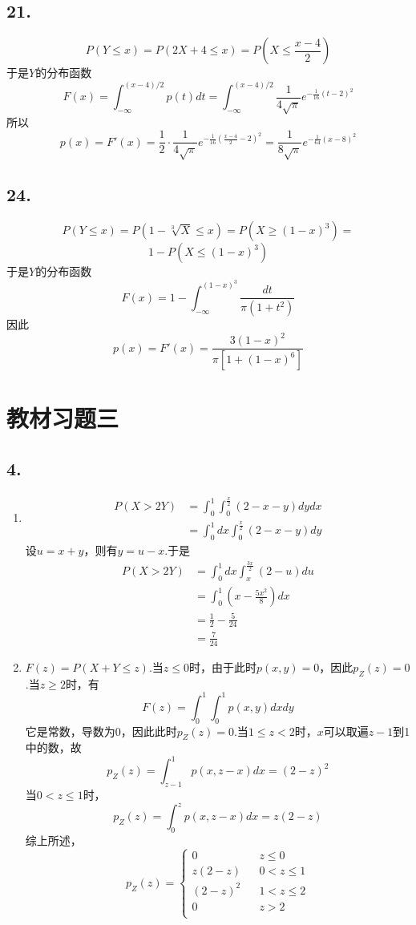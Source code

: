 \documentclass[twocolumn]{article}
\begin{document}
\begin{CJK}{UTF8}{gbsn}
				\subsection*{21.}
					\[P(Y\le x)=P(2X+4\le x)=P(X\le\frac{x-4}{2})\]于是$Y$的分布函数\[F(x)=\int_{-\infty}^{(x-4)/2}p(t)dt=\int_{-\infty}^{(x-4)/2}\frac{1}{4\sqrt{\pi}}e^{-\frac{1}{16}(t-2)^2}\]所以\[p(x)=F'(x)=\frac{1}{2}\cdot\frac{1}{4\sqrt{\pi}}e^{-\frac{1}{16}(\frac{x-4}{2}-2)^2}=\frac{1}{8\sqrt{\pi}}e^{-\frac{1}{64}(x-8)^2}\]
				\subsection*{24.}
					\[P(Y\le x)=P(1-\sqrt[3]{X}\le x)=P(X\ge(1-x)^3)=\]\[1-P(X\le(1-x)^3)\]于是$Y$的分布函数
					\[F(x)=1-\int_{-\infty}^{(1-x)^3}\frac{dt}{\pi(1+t^2)}\]因此\[p(x)=F'(x)=\frac{3(1-x)^2}{\pi[1+(1-x)^6]}\]
			\section*{教材习题三}
				\subsection*{4.}
					\begin{enumerate}[(1)]
						\item \begin{align*}
							P(X>2Y) & = \int_{0}^{1}\int_{0}^{\frac{x}{2}}(2-x-y)dydx\\
							& = \int_{0}^{1}dx\int_{0}^{\frac{x}{2}}(2-x-y)dy 
						\end{align*}
						设$u=x+y$，则有$y=u-x$.于是\begin{align*}
							P(X>2Y) & = \int_{0}^{1}dx\int_{x}^{\frac{3x}{2}}(2-u)du\\
							& = \int_{0}^{1}(x-\frac{5x^2}{8})dx\\
							& = \frac{1}{2}-\frac{5}{24}\\
							& = \frac{7}{24}
						\end{align*}
						\item $F(z)=P(X+Y\le z)$.当$z\le0$时，由于此时$p(x,y)=0$，因此$p_Z(z)=0$.当$z\ge2$时，有\[F(z)=\int_{0}^{1}\int_{0}^{1}p(x,y)dxdy\]它是常数，导数为0，因此此时$p_Z(z)=0$.当$1\le z<2$时，$x$可以取遍$z-1$到1中的数，故
						\[p_Z(z)=\int_{z-1}^{1}p(x,z-x)dx=(2-z)^2\]当$0<z\le1$时，\[p_Z(z)=\int_{0}^{z}p(x,z-x)dx=z(2-z)\]综上所述，\begin{equation*}
						p_Z(z)=\left\{
						\begin{array}{rcl}
						0 & & {z\le0}\\
						z(2-z) & & {0<z\le1}\\
						(2-z)^2 & & {1<z\le2}\\
						0 & & {z>2}\\
						\end{array} \right.
						\end{equation*}
					\end{enumerate}

\end{CJK}
\end{document}
